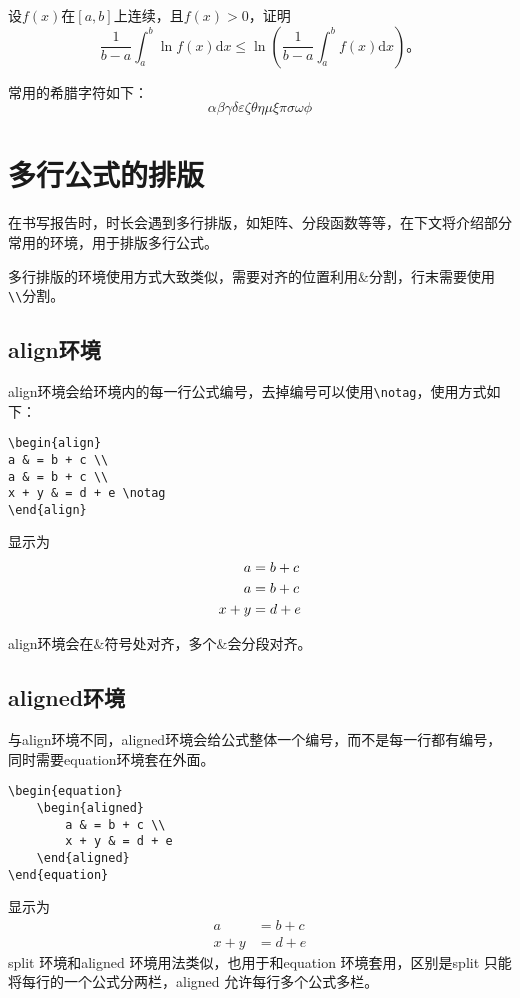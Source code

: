 设$f(x)$在$[a,b]$上连续，且$f(x)>0$，证明
\begin{equation}
\frac{1}{b-a}\int_{a}^{b}\ln f(x)\text{d}x\leqslant \ln \left(\frac{1}{b-a}\int_{a}^{b}f(x)\text{d}x\right)\text{。}
\end{equation}

常用的希腊字符如下：
\[\alpha \beta \gamma \delta \varepsilon \zeta \theta \eta \mu \xi \pi \sigma \omega \phi\]
\section{多行公式的排版}
在书写报告时，时长会遇到多行排版，如矩阵、分段函数等等，在下文将介绍部分常用的环境，用于排版多行公式。

多行排版的环境使用方式大致类似，需要对齐的位置利用$\&$分割，行末需要使用\verb|\\|分割。
\subsection{align环境}
align环境会给环境内的每一行公式编号，去掉编号可以使用\verb|\notag|，使用方式如下：
\begin{verbatim}
\begin{align}
a & = b + c \\
a & = b + c \\
x + y & = d + e \notag
\end{align}
\end{verbatim}
显示为
\begin{align}
a & = b + c \\
a & = b + c \\
x + y & = d + e \notag
\end{align}

align环境会在$\&$符号处对齐，多个$\&$会分段对齐。
\subsection{aligned环境}
与align环境不同，aligned环境会给公式整体一个编号，而不是每一行都有编号，同时需要equation环境套在外面。
\begin{verbatim}
\begin{equation}
	\begin{aligned}
		a & = b + c \\
		x + y & = d + e 
	\end{aligned}
\end{equation}
\end{verbatim}
显示为
\begin{equation}
	\begin{aligned}
		a & = b + c \\
		x + y & = d + e 
	\end{aligned}
\end{equation}
split 环境和aligned 环境用法类似，也用于和equation 环境套用，区别是split 只能
将每行的一个公式分两栏，aligned 允许每行多个公式多栏。
